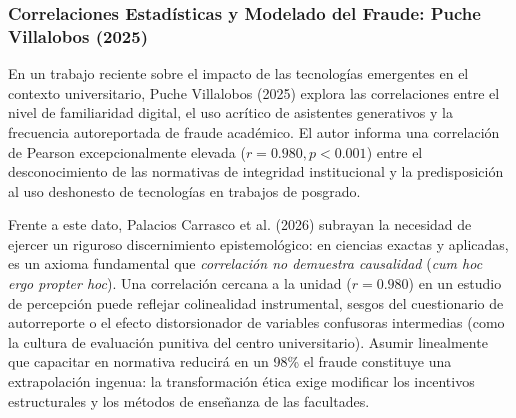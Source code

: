 \subsubsection{Correlaciones Estadísticas y Modelado del Fraude: Puche Villalobos (2025)}

En un trabajo reciente sobre el impacto de las tecnologías emergentes en el contexto universitario, Puche Villalobos (2025) explora las correlaciones entre el nivel de familiaridad digital, el uso acrítico de asistentes generativos y la frecuencia autoreportada de fraude académico. El autor informa una correlación de Pearson excepcionalmente elevada ($r = 0.980, p < 0.001$) entre el desconocimiento de las normativas de integridad institucional y la predisposición al uso deshonesto de tecnologías en trabajos de posgrado.

Frente a este dato, Palacios Carrasco et al. (2026) subrayan la necesidad de ejercer un riguroso discernimiento epistemológico: en ciencias exactas y aplicadas, es un axioma fundamental que \textit{correlación no demuestra causalidad} (\textit{cum hoc ergo propter hoc}). Una correlación cercana a la unidad ($r = 0.980$) en un estudio de percepción puede reflejar colinealidad instrumental, sesgos del cuestionario de autorreporte o el efecto distorsionador de variables confusoras intermedias (como la cultura de evaluación punitiva del centro universitario). Asumir linealmente que capacitar en normativa reducirá en un 98\% el fraude constituye una extrapolación ingenua: la transformación ética exige modificar los incentivos estructurales y los métodos de enseñanza de las facultades.

